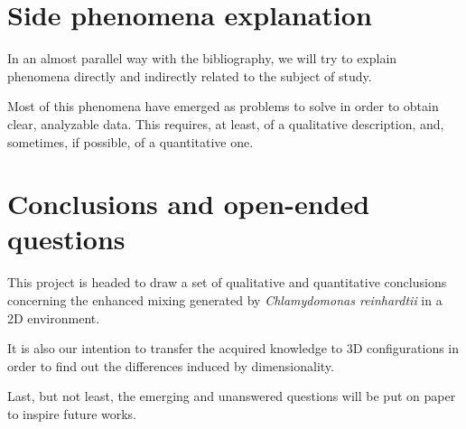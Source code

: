 \section{Side phenomena explanation}

In an almost parallel way with the bibliography, we will try to explain phenomena directly and indirectly related to the subject of study.

Most of this phenomena have emerged as problems to solve in order to obtain clear, analyzable data. This requires, at least, of a qualitative description, and, sometimes, if possible, of a quantitative one.

\section{Conclusions and open-ended questions}

This project is headed to draw a set of qualitative and quantitative conclusions concerning the enhanced mixing generated by \textit{Chlamydomonas reinhardtii} in a 2D environment.

It is also our intention to transfer the acquired knowledge to 3D configurations in order to find out the differences induced by dimensionality.

Last, but not least, the emerging and unanswered questions will be put on paper to inspire future works.
















